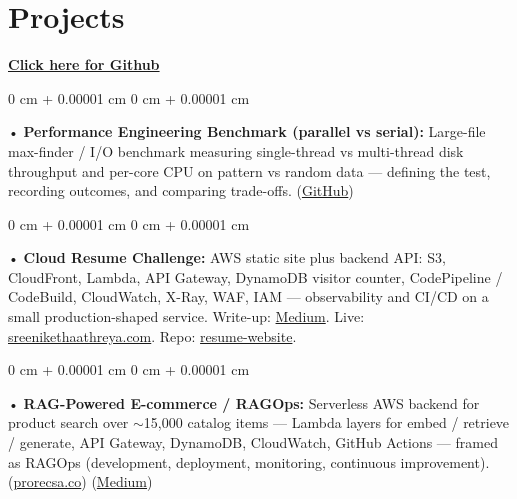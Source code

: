 \documentclass[10pt, letterpaper]{article}
\newenvironment{onecolentry}{
    \begin{adjustwidth}{
        0 cm + 0.00001 cm
    }{
        0 cm + 0.00001 cm
    }
}{
    \end{adjustwidth}
} %
\begin{document}
\section{Projects}
    \vspace{2 pt}
\textbf{\href{https://github.com/daedalus-s}{Click here for Github}}
\begin{onecolentry}
     • \textbf{Performance Engineering Benchmark (parallel vs serial):} Large-file max-finder / I/O benchmark measuring single-thread vs multi-thread disk throughput and per-core CPU on pattern vs random data --- defining the test, recording outcomes, and comparing trade-offs. (\href{https://github.com/daedalus-s/parallelvsserial}{GitHub})
\end{onecolentry}
\begin{onecolentry}
     • \textbf{Cloud Resume Challenge:} AWS static site plus backend API: S3, CloudFront, Lambda, API Gateway, DynamoDB visitor counter, CodePipeline / CodeBuild, CloudWatch, X-Ray, WAF, IAM --- observability and CI/CD on a small production-shaped service. Write-up: \href{https://medium.com/@sreenikethaathreya/cloud-resume-challenge-c4f17c3d53ff}{Medium}. Live: \href{https://sreenikethaathreya.com}{sreenikethaathreya.com}. Repo: \href{https://github.com/daedalus-s/resume-website}{resume-website}.
\end{onecolentry}
\begin{onecolentry}
     • \textbf{RAG-Powered E-commerce / RAGOps:} Serverless AWS backend for product search over $\sim$15,000 catalog items --- Lambda layers for embed / retrieve / generate, API Gateway, DynamoDB, CloudWatch, GitHub Actions --- framed as RAGOps (development, deployment, monitoring, continuous improvement). (\href{https://prorecsa.co}{prorecsa.co}) (\href{https://medium.com/@sreenikethaathreya/from-rags-to-riches-bba8a671d5e6}{Medium})
\end{onecolentry}
\vspace{2 pt}
        \vspace{2 pt }
\end{document}
